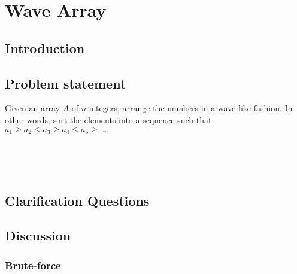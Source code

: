 %

\chapter{Wave Array}
\label{ch:wave_array}
\section*{Introduction}

\section{Problem statement}
\begin{exercise}
Given an array $A$ of $n$ integers, arrange the numbers in a wave-like fashion. 
In other words, sort the elements into a sequence such that $a_1 \geq a_2 \leq a_3 \geq a_4 \leq a_5 \geq \ldots$
\end{exercise}


\begin{example}
	\hfill \\
	
\end{example}

\begin{example}
	\hfill \\
	
\end{example}

\section{Clarification Questions}

\begin{QandA}
	\item 
	\begin{answered}
		\textit{}
	\end{answered}
	
\end{QandA}

\section{Discussion}
\label{wave_array:sec:discussion}


\subsection{Brute-force}
\label{wave_array:sec:bruteforce}



